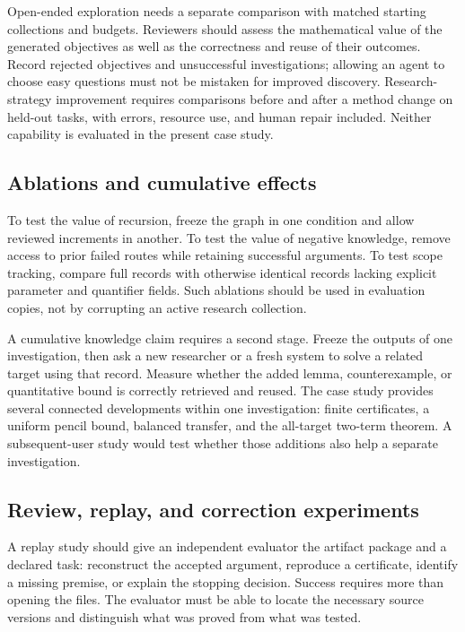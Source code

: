 Open-ended exploration needs a separate comparison with matched starting collections and budgets. Reviewers should assess the mathematical value of the generated objectives as well as the correctness and reuse of their outcomes. Record rejected objectives and unsuccessful investigations; allowing an agent to choose easy questions must not be mistaken for improved discovery. Research-strategy improvement requires comparisons before and after a method change on held-out tasks, with errors, resource use, and human repair included. Neither capability is evaluated in the present case study.

\subsection{Ablations and cumulative effects}

To test the value of recursion, freeze the graph in one condition and allow reviewed increments in another. To test the value of negative knowledge, remove access to prior failed routes while retaining successful arguments. To test scope tracking, compare full records with otherwise identical records lacking explicit parameter and quantifier fields. Such ablations should be used in evaluation copies, not by corrupting an active research collection.

A cumulative knowledge claim requires a second stage. Freeze the outputs of one investigation, then ask a new researcher or a fresh system to solve a related target using that record. Measure whether the added lemma, counterexample, or quantitative bound is correctly retrieved and reused. The case study provides several connected developments within one investigation: finite certificates, a uniform pencil bound, balanced transfer, and the all-target two-term theorem. A subsequent-user study would test whether those additions also help a separate investigation.

\subsection{Review, replay, and correction experiments}

A replay study should give an independent evaluator the artifact package and a declared task: reconstruct the accepted argument, reproduce a certificate, identify a missing premise, or explain the stopping decision. Success requires more than opening the files. The evaluator must be able to locate the necessary source versions and distinguish what was proved from what was tested.

